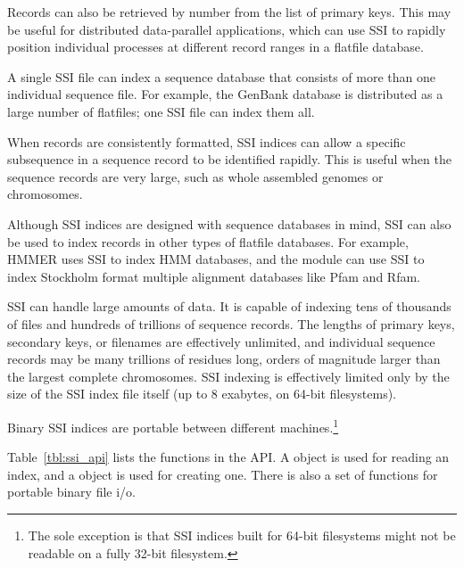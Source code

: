 Records can also be retrieved by number from the list of primary keys.
This may be useful for distributed data-parallel applications, which
can use SSI to rapidly position individual processes at different
record ranges in a flatfile database.

A single SSI file can index a sequence database that consists of more
than one individual sequence file. For example, the GenBank database
is distributed as a large number of flatfiles; one SSI file can index
them all.

When records are consistently formatted, SSI indices can allow a
specific subsequence in a sequence record to be identified
rapidly. This is useful when the sequence records are very large, such
as whole assembled genomes or chromosomes.

Although SSI indices are designed with sequence databases in mind, SSI
can also be used to index records in other types of flatfile
databases. For example, HMMER uses SSI to index HMM databases, and the
 module can use SSI to index Stockholm format multiple
alignment databases like Pfam and Rfam.

SSI can handle large amounts of data. It is capable of indexing tens
of thousands of files and hundreds of trillions of sequence records.
The lengths of primary keys, secondary keys, or filenames are
effectively unlimited, and individual sequence records may be many
trillions of residues long, orders of magnitude larger than the
largest complete chromosomes. SSI indexing is effectively limited only
by the size of the SSI index file itself (up to 8 exabytes, on 64-bit
filesystems).

Binary SSI indices are portable between different
machines.\footnote{The sole exception is that SSI indices built for
64-bit filesystems might not be readable on a fully 32-bit
filesystem.}

Table~\ref{tbl:ssi_api} lists the functions in the  API.
A  object is used for reading an index, and a
 object is used for creating one. There is also a
set of functions for portable binary file i/o.


